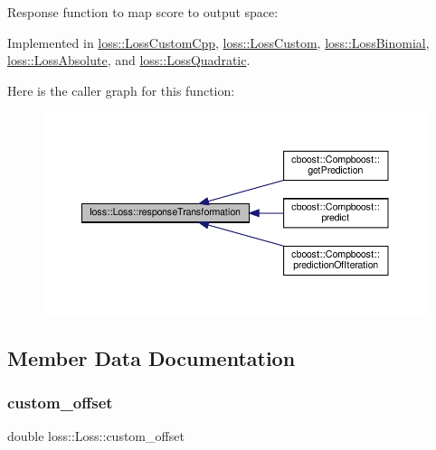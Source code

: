 Response function to map score to output space\+: 



Implemented in \mbox{\hyperlink{classloss_1_1_loss_custom_cpp_ace7a23f6b0da58d12f1dec29e26acf18}{loss\+::\+Loss\+Custom\+Cpp}}, \mbox{\hyperlink{classloss_1_1_loss_custom_a42d9a0131836a056551c1073474cc8b9}{loss\+::\+Loss\+Custom}}, \mbox{\hyperlink{classloss_1_1_loss_binomial_a757fd8d478732ce94e8ba9497846bcf4}{loss\+::\+Loss\+Binomial}}, \mbox{\hyperlink{classloss_1_1_loss_absolute_a490d0fdab3e1af9cddbca77b8170263a}{loss\+::\+Loss\+Absolute}}, and \mbox{\hyperlink{classloss_1_1_loss_quadratic_a2534e3ec615acd6d0c80c2dbcfb8c1e9}{loss\+::\+Loss\+Quadratic}}.

Here is the caller graph for this function\+:\nopagebreak
\begin{figure}[H]
\begin{center}
\leavevmode
\includegraphics[width=350pt]{classloss_1_1_loss_a0a84b7df79b08e40b538aaa7e6ee75c4_icgraph}
\end{center}
\end{figure}


\subsection{Member Data Documentation}
\mbox{\label{classloss_1_1_loss_ae5dc373f54ed65ee0ca54a921ef826f4}} 
\subsubsection{\texorpdfstring{custom\+\_\+offset}{custom\_offset}}
{\footnotesize\ttfamily double loss\+::\+Loss\+::custom\+\_\+offset\hspace{0.3cm}{\ttfamily [protected]}}



